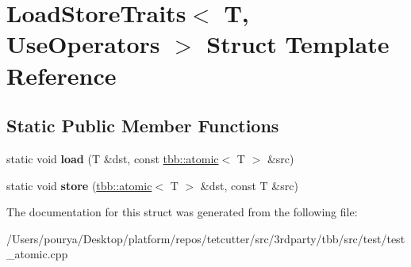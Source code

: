 \hypertarget{structLoadStoreTraits_3_01T_00_01UseOperators_01_4}{}\section{Load\+Store\+Traits$<$ T, Use\+Operators $>$ Struct Template Reference}
\label{structLoadStoreTraits_3_01T_00_01UseOperators_01_4}
\subsection*{Static Public Member Functions}
\begin{DoxyCompactItemize}
\item 
\hypertarget{structLoadStoreTraits_3_01T_00_01UseOperators_01_4_aa5e6561291ede321b480bf531308cc93}{}static void {\bfseries load} (T \&dst, const \hyperlink{structtbb_1_1atomic}{tbb\+::atomic}$<$ T $>$ \&src)\label{structLoadStoreTraits_3_01T_00_01UseOperators_01_4_aa5e6561291ede321b480bf531308cc93}

\item 
\hypertarget{structLoadStoreTraits_3_01T_00_01UseOperators_01_4_a29b09f6b55202c645e162f3766337864}{}static void {\bfseries store} (\hyperlink{structtbb_1_1atomic}{tbb\+::atomic}$<$ T $>$ \&dst, const T \&src)\label{structLoadStoreTraits_3_01T_00_01UseOperators_01_4_a29b09f6b55202c645e162f3766337864}

\end{DoxyCompactItemize}


The documentation for this struct was generated from the following file\+:\begin{DoxyCompactItemize}
\item 
/\+Users/pourya/\+Desktop/platform/repos/tetcutter/src/3rdparty/tbb/src/test/test\+\_\+atomic.\+cpp\end{DoxyCompactItemize}

